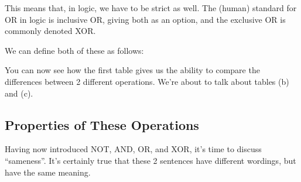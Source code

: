 This means that, in logic, we have to be strict as well. The (human) standard for OR in logic is inclusive OR, giving both as an option, and the exclusive OR is commonly denoted XOR.

We can define both of these as follows:

\begin{table}[ht]
\centering
{}
\quad
{}
\quad
{}
\caption{Tables for Describing the Boolean Logic AND Operator}
\end{table}

You can now see how the first table gives us the ability to compare the differences between 2 different operations. We're about to talk about tables (b) and (c).

\subsection{Properties of These Operations}
Having now introduced NOT, AND, OR, and XOR, it's time to discuss ``sameness''. It's certainly true that these 2 sentences have different wordings, but have the same meaning.

